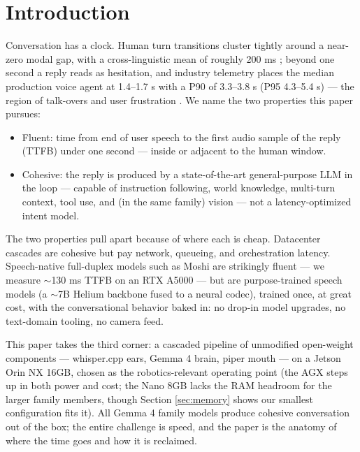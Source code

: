\documentclass{article}
\begin{document}

\section{Introduction}

Conversation has a clock. Human turn transitions cluster tightly around a near-zero modal gap, with a cross-linguistic mean of roughly 200 ms \citep{stivers2009turntaking}; beyond one second a reply reads as hesitation, and industry telemetry places the median production voice agent at 1.4–1.7 s with a P90 of 3.3–3.8 s (P95 4.3–5.4 s) — the region of talk-overs and user frustration \citep{sharma2026latency,hamming2026metrics}. We name the two properties this paper pursues:

\begin{itemize}
	\item Fluent: time from end of user speech to the first audio sample of the reply (TTFB) under one second — inside or adjacent to the human window.
	\item Cohesive: the reply is produced by a state-of-the-art general-purpose LLM in the loop — capable of instruction following, world knowledge, multi-turn context, tool use, and (in the same family) vision — not a latency-optimized intent model.
\end{itemize}

The two properties pull apart because of where each is cheap. Datacenter cascades are cohesive but pay network, queueing, and orchestration latency. Speech-native full-duplex models such as Moshi \citep{defossez2024moshi} are strikingly fluent — we measure $\sim$130 ms TTFB on an RTX A5000 — but are purpose-trained speech models (a $\sim$7B Helium backbone fused to a neural codec), trained once, at great cost, with the conversational behavior baked in: no drop-in model upgrades, no text-domain tooling, no camera feed.

This paper takes the third corner: a cascaded pipeline of unmodified open-weight components — whisper.cpp ears, Gemma 4 brain, piper mouth — on a Jetson Orin NX 16GB, chosen as the robotics-relevant operating point (the AGX steps up in both power and cost; the Nano 8GB lacks the RAM headroom for the larger family members, though Section \ref{sec:memory} shows our smallest configuration fits it). All Gemma 4 family models produce cohesive conversation out of the box; the entire challenge is speed, and the paper is the anatomy of where the time goes and how it is reclaimed.
\end{document}
